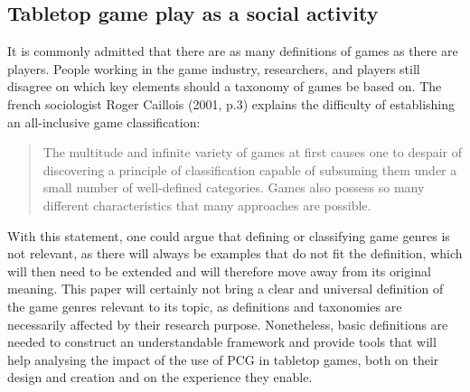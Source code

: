 \subsection{Tabletop game play as a social activity}
It is commonly admitted that there are as many definitions of games as there are players. People working in the game industry, researchers, and players still disagree on which key elements should a taxonomy of games be based on. The french sociologist Roger Caillois (2001, p.3)\cite{book:mpg} explains the difficulty of establishing an all-inclusive game classification:
\begin{quotation}
The multitude and infinite variety of games at first causes one to despair of discovering a principle of classification capable of subsuming them under a small number of well-defined categories. Games also possess so many different characteristics that many approaches are possible.
\end{quotation} 
With this statement, one could argue that defining or classifying game genres is not relevant, as there will always be examples that do not fit the definition, which will then need to be extended and will therefore move away from its original meaning. This paper will certainly not bring a clear and universal definition of the game genres relevant to its topic, as definitions and taxonomies are necessarily affected by their research purpose. Nonetheless, basic definitions are needed to construct an understandable framework and provide tools that will help analysing the impact of the use of PCG in tabletop games, both on their design and creation and on the experience they enable.


